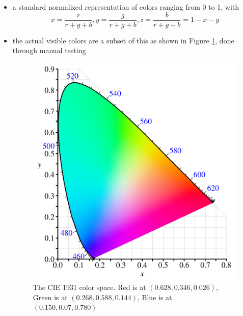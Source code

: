 \documentclass[twocolumn,landscape,10pt]{article}
\theoremstyle{definition}
\begin{document}
\begin{itemize}
    \item a standard normalized representation of colors
        ranging from 0 to 1, with
        \[
            x=\frac{r}{r+g+b},y=\frac{g}{r+g+b},z=\frac{b}{r+g+b}=1-x-y
        \]
    \item the actual visible colors are a subset of this as shown in Figure
        \ref{fig:cie},
        done through manual testing
        \begin{figure}
          	\includegraphics[scale=0.20]{cie.png}
          	\centering
          	\caption{The CIE 1931 color space. Red is at $(0.628,0.346,0.026)$,
            Green is at $(0.268, 0.588,0.144)$, Blue is at $(0.150,0.07,0.780)$}\label{fig:cie}
        \end{figure}
        

\end{itemize}
\end{document}
